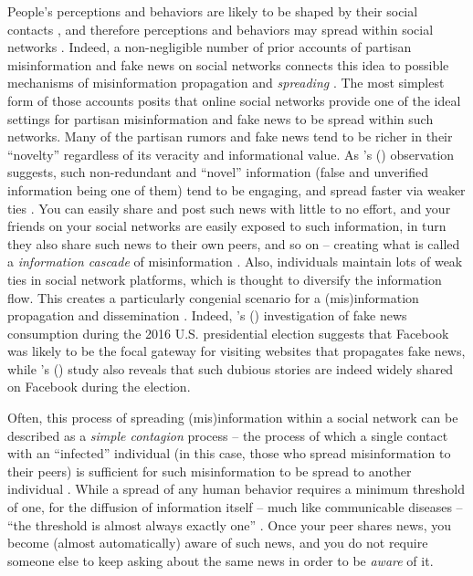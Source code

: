 \documentclass[man, 12pt, a4paper, noextraspace]{apa6}
\begin{document}
  People's perceptions and behaviors are likely to be shaped by their social contacts \parencite{lazer2010coevolution, centola2007complex}, and therefore perceptions and behaviors may spread within social networks \parencite[e.g.,][]{bond_61million}. Indeed, a non-negligible number of prior accounts of partisan misinformation and fake news on social networks connects this idea to possible mechanisms of misinformation propagation and \emph{spreading}  \parencite[e.g.,][]{del2016spreading, Bakshy_2012}. The most simplest form of those accounts posits that online social networks provide one of the ideal settings for partisan misinformation and fake news to be spread within such networks. Many of the partisan rumors and fake news tend to be richer in their \enquote{novelty} \parencite{wu2007novelty} regardless of its veracity and informational value. As \citeauthor{giglietto2016fakes}'s (\citeyear{giglietto2016fakes}) observation suggests, such non-redundant and \enquote{novel} information (false and unverified information being one of them) tend to be engaging, and spread faster via weaker ties \parencite{granovetter1977strength}. You can easily share and post such news with little to no effort, and your friends on your social networks are easily exposed to such information, in turn they also share such news to their own peers, and so on -- creating what is called a \emph{information cascade} of misinformation \parencite{del2016spreading}. Also, individuals maintain lots of weak ties in social network platforms, which is thought to diversify the information flow. This creates a particularly congenial scenario for a (mis)information propagation and dissemination \parencite{Bakshy_2012, granovetter1977strength}. Indeed, \citeauthor{guess2018selective}'s (\citeyear{guess2018selective}) investigation of fake news consumption during the 2016 U.S. presidential election suggests that Facebook was likely to be the focal gateway for visiting websites that propagates fake news, while \citeauthor{allcott2017social}'s (\citeyear{allcott2017social}) study also reveals that such dubious stories are indeed widely shared on Facebook during the election. 
    
    Often, this process of spreading (mis)information within a social network can be described as a \emph{simple contagion} process -- the process of which a single contact with an \enquote{infected} individual (in this case, those who spread misinformation to their peers) is sufficient for such misinformation to be spread to another individual \parencite{Monsted_plos2017, Centola2010Sience, siegel2009social}. While a spread of any human behavior requires a minimum threshold of one, for the diffusion of information itself -- much like communicable diseases -- \enquote{the threshold is almost always exactly one}  \parencites[][p. 706]{centola2007complex}[also see][]{Centola2010Sience}. Once your peer shares news, you become (almost automatically) aware of such news, and you do not require someone else to keep asking about the same news in order to be \emph{aware} of it.  
    
\end{document}
